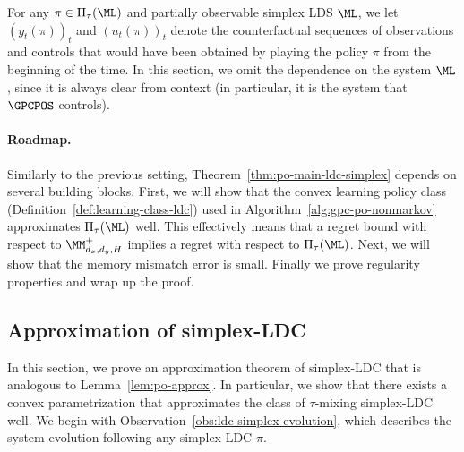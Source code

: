 For any $\pi \in \Pi_{\tau}(\ML)$ and partially observable simplex LDS $\ML$, we let $(y_t(\pi))_t$ and $(u_t(\pi))_t$ denote the counterfactual sequences of observations and controls that would have been obtained by playing the policy $\pi$ from the beginning of the time. In this section, we omit the dependence on the system $\ML$, since it is always clear from context (in particular, it is the system that $\GPCPOS$ controls). 

\paragraph{Roadmap.} Similarly to the previous setting, Theorem~\ref{thm:po-main-ldc-simplex} depends on several building blocks. First, we will show that the convex learning policy class (Definition~\ref{def:learning-class-ldc}) used in Algorithm~\ref{alg:gpc-po-nonmarkov} approximates $\Pi_{\tau}(\ML)$ well. This effectively means that a regret bound with respect to $\MM_{d_x,d_y,H}^{+}$ implies a regret with respect to $\Pi_{\tau}(\ML)$. Next, we will show that the memory mismatch error is small. Finally we prove regularity properties and wrap up the proof.

\fi

\subsection{Approximation of simplex-LDC}
\label{sec:approx-simplex-ldc}
In this section, we prove an approximation theorem of simplex-LDC that is analogous to Lemma~\ref{lem:po-approx}. In particular, we show that there exists a convex parametrization that approximates the class of $\tau$-mixing simplex-LDC well. We begin with Observation~\ref{obs:ldc-simplex-evolution}, which describes the system evolution following any simplex-LDC $\pi$.

